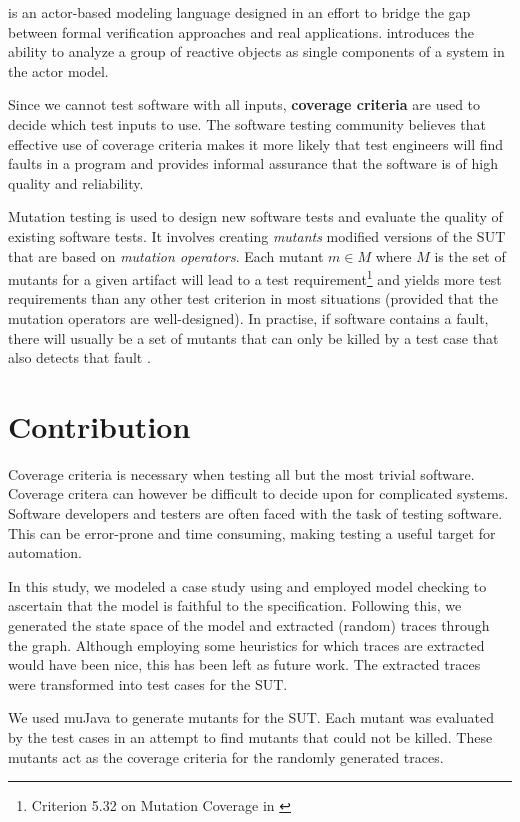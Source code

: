 \documentclass{article}
\begin{document}
		\Rebeca is an actor-based modeling language designed in an effort to bridge the gap between formal verification approaches and real applications. \Rebeca introduces the ability to analyze a group of reactive objects as single components of a system in the actor model.

		Since we cannot test software with all inputs, \textbf{coverage criteria} are used to decide which test inputs to use. The software testing community believes that effective use of coverage criteria makes it more likely that test engineers will find faults in a program and provides informal assurance that the software is of high quality and reliability. 

		Mutation testing is used to design new software tests and evaluate the quality of existing software tests. It involves creating \textit{mutants} modified versions of the SUT that are based on \textit{mutation operators}. Each mutant $m \in M$ where $M$ is the set of mutants for a given artifact will lead to a test requirement\footnote{Criterion 5.32 on Mutation Coverage in \citet{ammann2008introduction}} and yields more test requirements than any other test criterion in most situations (provided that the mutation operators are well-designed). In practise, if software contains a fault, there will usually be a set of mutants that can only be killed by a test case that also detects that fault \citep{ammann2008introduction}.

	\section{Contribution}
		Coverage criteria is necessary when testing all but the most trivial software. Coverage critera can however be difficult to decide upon for complicated systems. Software developers and testers are often faced with the task of testing software. This can be error-prone and time consuming, making testing a useful target for automation.

		In this study, we modeled a case study using \Rebeca and employed model checking to ascertain that the model is faithful to the specification. Following this, we generated the state space of the model and extracted (random) traces through the graph. Although employing some heuristics for which traces are extracted would have been nice, this has been left as future work. The extracted traces were transformed into test cases for the SUT.

		We used muJava to generate mutants for the SUT. Each mutant was evaluated by the test cases in an attempt to find mutants that could not be killed. These mutants act as the coverage criteria for the randomly generated traces.
\end{document}
